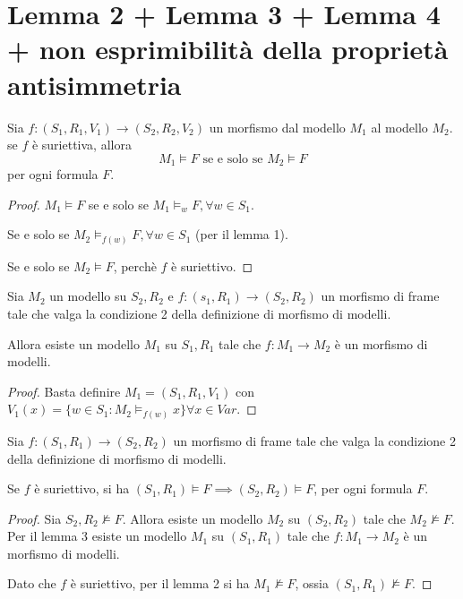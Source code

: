 \documentclass[10pt,a4paper,twoside]{book}
\begin{document}
\section{Lemma 2 + Lemma 3 + Lemma 4 + non esprimibilità della proprietà antisimmetria}
\begin{lemma}[Lemma 2]
    Sia $f: (S_1,R_1,V_1) \rightarrow (S_2,R_2,V_2)$ un morfismo dal modello $M_1$ al modello $M_2$. se $f$ è suriettiva, allora
    \begin{equation*}
        M_1 \vDash F \text{ se e solo se } M_2 \vDash F
    \end{equation*}
    per ogni formula $F$.
\end{lemma}
\begin{proof}
    $M_1 \vDash F$ se e solo se $M_1 \vDash_w F, \forall w \in S_1$.

    Se e solo se $M_2 \vDash_{f(w)} F, \forall w \in S_1$ (per il lemma 1).

    Se e solo se $M_2 \vDash F$, perchè $f$ è suriettivo.
\end{proof}
\begin{lemma}[Lemma 3]
    Sia $M_2$ un modello su $S_2, R_2$ e $f: (s_1,R_1) \rightarrow (S_2, R_2)$ un morfismo di frame tale che valga la condizione 2 della definizione di morfismo di modelli.

    Allora esiste un modello $M_1$ su $S_1, R_1$ tale che $f: M_1 \rightarrow M_2$ è un morfismo di modelli.
\end{lemma}
\begin{proof}
    Basta definire $M_1 = (S_1, R_1, V_1)$ con $V_1(x) = \{ w \in S_1 : M_2 \vDash_{f(w)} x\} \forall x \in Var$.
\end{proof}
\begin{lemma}[Lemma 4]
    Sia $f: (S_1, R_1) \rightarrow (S_2, R_2)$ un morfismo di frame tale che valga la condizione 2 della definizione di morfismo di modelli.

    Se $f$ è suriettivo, si ha $(S_1, R_1) \vDash F \implies (S_2, R_2) \vDash F$, per ogni formula $F$.
\end{lemma}
\begin{proof}
    Sia $S_2, R_2 \nvDash F$. Allora esiste un modello $M_2$ su $(S_2, R_2)$ tale che $M_2 \nvDash F$. Per il lemma 3 esiste un modello $M_1$ su $(S_1, R_1)$ tale che $f: M_1 \rightarrow M_2$ è un morfismo di modelli.

    Dato che $f$ è suriettivo, per il lemma 2 si ha $M_1 \nvDash F$, ossia $(S_1, R_1) \nvDash F$.
\end{proof}
\end{document}
